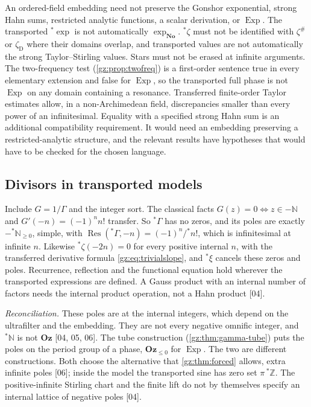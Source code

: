 \documentclass[11pt,a4paper]{article}
\numberwithin{equation}{section}
\theoremstyle{definition}
\theoremstyle{remark}
\newcommand{\No}{\mathbf{No}}
\newcommand{\Oz}{\mathbf{Oz}}
\newcommand{\Z}{\mathbb Z}
\newcommand{\N}{\mathbb N}
\newcommand{\Res}{\operatorname{Res}}
\newcommand{\Exp}{\operatorname{Exp}}
\newcommand{\zD}{\zeta_{\mathrm D}}
\newcommand{\zp}{\zeta^{\#}}
\newcommand{\src}[1]{\textup{[#1]}}
\begin{document}
\begin{warning}[Transported operations are extra structure \src{04, 05, 06}]\label{gz:warn:transported}
An ordered-field embedding need not preserve the Gonshor exponential, strong
Hahn sums, restricted analytic functions, a scalar derivation, or $\Exp$. The
transported ${}^*\exp$ is not automatically $\exp_{\No}$. ${}^*\zeta$ must not be
identified with $\zp$ or $\zD$ where their domains overlap, and transported
values are not automatically the strong Taylor--Stirling values. Stars must
not be erased at infinite arguments. The two-frequency test
(\cref{gz:prop:twofreq}) is a first-order sentence true in every elementary
extension and false for $\Exp$, so the transported full phase is not $\Exp$
on any domain containing a resonance. Transferred finite-order Taylor
estimates allow, in a non-Archimedean field, discrepancies smaller than every
power of an infinitesimal. Equality with a specified strong Hahn sum is an
additional compatibility requirement. It would need an embedding preserving
a restricted-analytic structure, and the relevant results
\cite{vdDE,CE,EK} have hypotheses that would have to be checked for the chosen
language.
\end{warning}

\subsection{Divisors in transported models}\label{gz:sec:transported-divisors}
Include $G=1/\Gamma$ and the integer sort. The classical facts
$G(z)=0\iff z\in-\N$ and $G'(-n)=(-1)^nn!$ transfer. So ${}^*\Gamma$ has no
zeros, and its poles are exactly $-{}^*\N_{\ge0}$, simple, with
$\Res({}^*\Gamma,-n)=(-1)^n/{}^*n!$, which is infinitesimal at infinite $n$.
Likewise ${}^*\zeta(-2n)=0$ for every positive internal $n$, with the
transferred derivative formula \eqref{gz:eq:trivialslope}, and ${}^*\xi$ cancels
these zeros and poles. Recurrence, reflection and the functional equation
hold wherever the transported expressions are defined. A Gauss product with
an internal number of factors needs the internal product operation, not a
Hahn product \src{04}.

\emph{Reconciliation.} These poles are at the internal integers, which depend
on the ultrafilter and the embedding. They are not every negative omnific
integer, and ${}^*\N$ is not $\Oz$ \src{04, 05, 06}. The tube construction
(\cref{gz:thm:gamma-tube}) puts the poles on the period group of a phase,
$\Oz_{\le0}$ for $\Exp$. The two are different constructions. Both choose the
alternative that \cref{gz:thm:forced} allows, extra infinite poles \src{06};
inside the model the transported sine has zero set $\pi\,{}^*\Z$. The
positive-infinite Stirling chart and the finite lift do not by themselves
specify an internal lattice of negative poles \src{04}.
\end{document}
